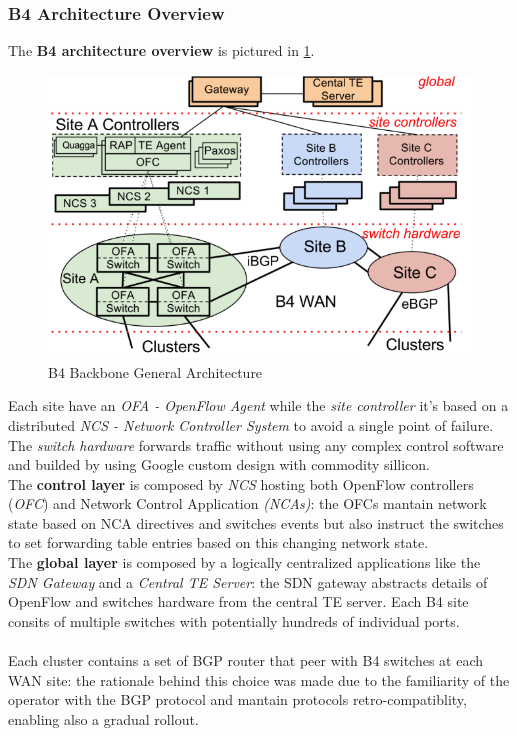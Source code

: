 \documentclass[10pt,a4paper]{report}
\theoremstyle{definition}
\begin{document}
\subsubsection{B4 Architecture Overview}
\label{sec:b4-architecture-overview}
The \textbf{B4 architecture overview} is pictured in \ref{b4-arch}.
\begin{figure}[h]
	\centering\includegraphics[scale=0.50]{images/Pasted image 20230329172844.png}
	\caption{B4 Backbone General Architecture}
\label{b4-arch}
\end{figure}
Each site have an \textit{OFA - OpenFlow Agent} while the \textit{site controller} it's based on a distributed \textit{NCS - Network Controller System} to avoid a single point of failure.
The \textit{switch hardware} forwards traffic without using any complex control software and builded by using Google custom design with commodity sillicon.\\
The \textbf{control layer} is composed by \textit{NCS} hosting both  OpenFlow controllers (\textit{OFC}) and Network Control Application \textit{(NCAs)}: the OFCs mantain network state based on NCA directives and switches events but also instruct the switches to set forwarding table entries based on this changing network state.\\
The \textbf{global layer} is composed by a logically centralized applications like the \textit{SDN Gateway} and a \textit{Central TE Server}: the SDN gateway abstracts details of OpenFlow and switches hardware from the central TE server. Each B4 site consits of multiple switches with potentially hundreds of individual ports.\\\\
Each cluster contains a set of BGP router that peer with B4 switches at each WAN site: the rationale behind this choice was made due to the familiarity of the operator with the BGP protocol and mantain protocols retro-compatiblity, enabling also a gradual rollout.
\end{document}

